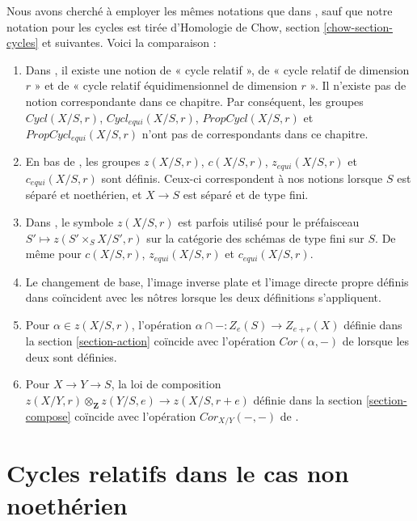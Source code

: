 \noindent
 Nous avons cherché à employer les mêmes notations que dans \cite{SV}, sauf que notre
 notation pour les cycles est tirée 
d'Homologie de Chow, section \ref{chow-section-cycles} et suivantes.
 Voici la comparaison : 
\begin{enumerate} 
\item Dans  \cite[section 3.1]{SV} , il existe une notion
 de « cycle relatif », de « cycle relatif de dimension  $r$ » et 
de « cycle relatif équidimensionnel de dimension $r$ ». 
Il n'existe pas de notion correspondante dans ce chapitre. Par conséquent, les groupes  
$Cycl(X/S, r)$,  $Cycl_{equi}(X/S, r)$,  
$PropCycl(X/S, r)$ et  $PropCycl_{equi}(X/S, r)$ 
n'ont pas de correspondants dans ce chapitre. 
\item En bas de  \cite[page 36]{SV} , les groupes  
$z(X/S, r)$,  $c(X/S, r)$,  $z_{equi}(X/S, r)$ et $c_{equi}(X/S, r)$
  sont définis. Ceux-ci correspondent à nos notions lorsque $S$ est séparé et
 noethérien, et $X \to S$ est séparé et de type fini. 
\item Dans  \cite{SV} , le symbole  $z(X/S, r)$  est parfois utilisé pour le 
préfaisceau $S' \mapsto z(S' \times_S X/S', r)$  sur la catégorie des schémas
 de type fini sur  $S$. De même pour  
$c(X/S, r)$,  $z_{equi}(X/S, r)$ et  $c_{equi}(X/S, r)$. 
\item Le changement de base, l'image inverse plate et l'image directe 
propre définis dans \cite{SV} coïncident avec les nôtres lorsque les deux définitions s'appliquent. 
\item Pour $\alpha \in z(X/S, r)$, l'opération 
$\alpha \cap - : Z_e(S) \to Z_{e + r}(X)$ définie dans 
la section \ref{section-action} coïncide avec
 l'opération $Cor(\alpha, -)$ de \cite[section 3.7]{SV} lorsque
 les deux sont définies. 
\item Pour $X \to Y \to S$, la loi de composition 
$z(X/Y, r) \otimes_\mathbf{Z} z(Y/S, e) \longrightarrow z(X/S, r + e)$
 définie dans la section \ref{section-compose}
 coïncide avec l'opération $Cor_{X/Y}(-, -)$ de 
\cite[corollaire 3.7.5]{SV}. 
\end{enumerate} 











\section{Cycles relatifs dans le cas non noethérien} 
\label{section-non-noetherian} 

